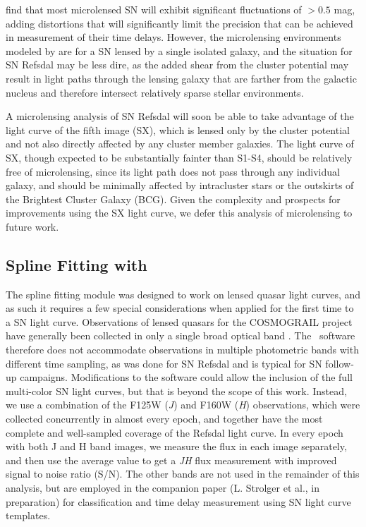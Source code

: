 \citet{Dobler:2006} find that most microlensed SN will exhibit significant fluctuations of $>0.5$ mag, adding distortions that will significantly limit the precision that can be achieved in measurement of their time delays.  However, the microlensing environments modeled by \citep{Dobler:2006} are for a SN lensed by a single isolated galaxy, and the situation for SN Refsdal may be less dire, as the added shear from the  cluster potential may result in light paths through the lensing galaxy that are farther from the galactic nucleus and therefore intersect relatively sparse stellar environments.  

A microlensing analysis of SN Refsdal will soon be able to take advantage of the light curve of the fifth image (SX), which is lensed only by the  cluster potential and not also directly affected by any cluster member galaxies.  The light curve of SX, though expected to be substantially fainter than S1-S4, should be relatively free of microlensing, since its light path does not pass through any individual galaxy, and should be minimally affected by intracluster stars or the outskirts of the  Brightest Cluster Galaxy (BCG).  Given the complexity and prospects for improvements using the SX light curve, we defer this analysis of microlensing to future work.  

\subsection{Spline Fitting with \pycs}\label{sec:PycsSplineFitting}


The \pycs spline fitting module was designed to work on lensed quasar light curves, and as such it requires a few special considerations when applied for the first time to a SN light curve.  Observations of lensed quasars for the COSMOGRAIL project have generally been collected in only a single broad optical band \citep[e.g.][]{Courbin:2011,Tewes:2013b}.  The \pycs\ software therefore does not accommodate observations in multiple photometric bands with different time sampling, as was done for SN Refsdal and is typical for SN follow-up campaigns.  Modifications to the software could allow the inclusion of the full multi-color SN light curves, but that is beyond the scope of this work.  Instead, we use a combination of the F125W ({\it J}) and F160W ({\it H}) observations, which were collected concurrently in almost every epoch, and together have the most complete and well-sampled coverage of the Refsdal light curve.  In every epoch with both J and H band images, we measure the flux in each image separately, and then use the average value to get a {\it JH} flux measurement with improved signal to noise ratio (S/N).   The other bands are not used in the remainder of this analysis, but are employed in the companion paper (L. Strolger et al., in preparation) for classification and time delay measurement using SN light curve templates. 

